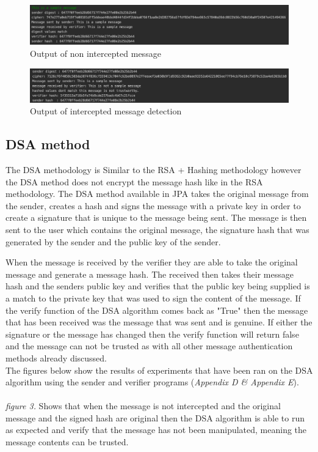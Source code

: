 \documentclass[a4paper, twoside, 11pt]{article}
\begin{document}
\begin{figure}[H]
	\centering
	\includegraphics[scale=0.5]{Images/successMessage.png}
  \caption{Output of non intercepted message}
\end{figure}


\begin{figure}[H]
	\centering
	\includegraphics[scale=0.5]{Images/interceptedMessage.png}
  \caption{Output of intercepted message detection}
\end{figure}

\subsection{DSA method}
The DSA methodology is Similar to the RSA + Hashing methodology however the DSA method does not encrypt the message hash like in the RSA methodology. The DSA method available in JPA takes the original message from the sender, creates a hash and signs the message with a private key in order to create a signature that is unique to the message being sent. The message is then sent to the user which contains the original message, the signature hash that was generated by the sender and the public key of the sender.

When the message is received by the verifier they are able to take the original message and generate a message hash. The received then takes their message hash and the senders public key and verifies that the public key being supplied is a match to the private key that was used to sign the content of the message. If the verify function of the DSA algorithm comes back as "True" then the message that has been received was the message that was sent and is genuine. If either the signature or the message has changed then the verify function will return false and the message can not be trusted as with all other message authentication methods already discussed. \\

The figures below show the results of experiments that have been ran on the DSA algorithm using the sender and verifier programs (\textit{Appendix D \& Appendix E}).\\
\\
\textit{figure 3.} Shows that when the message is not intercepted and the original message and the signed hash are original then the DSA algorithm is able to run as expected and verify that the message has not been manipulated, meaning the message contents can be trusted.
\end{document}
